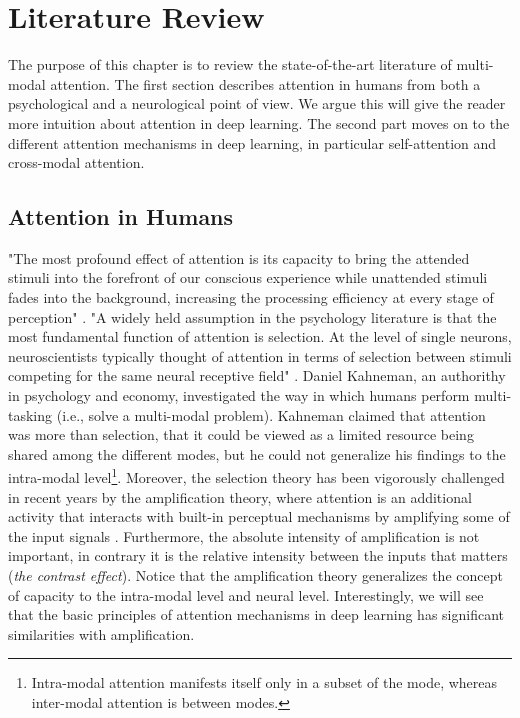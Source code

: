 \chapter{Literature Review}\label{chapter-literature-review} 

The purpose of this chapter is to review the state-of-the-art literature of multi-modal attention. The first section describes attention in humans from both a psychological and a neurological point of view. We argue this will give the reader more intuition about attention in deep learning. The second part moves on to the different attention mechanisms in deep learning, in particular self-attention and cross-modal attention. 


\section{Attention in Humans}
"The most profound effect of attention is its capacity to bring the attended stimuli into the forefront of our conscious experience while unattended stimuli fades into the background, increasing the processing efficiency at every stage of perception" \citep{watzl}. "A widely held assumption in the psychology literature is that the most fundamental function of attention is selection. At the level of single neurons, neuroscientists typically thought of attention in terms of selection between stimuli competing for the same neural receptive field" \citep{neuro-level}. Daniel Kahneman, an authorithy in psychology and economy, investigated the way in which humans perform multi-tasking (i.e., solve a multi-modal problem). Kahneman claimed that attention was more than selection, that it could be viewed as a limited resource being shared among the different modes, but he could not generalize his findings to the intra-modal level\footnote{Intra-modal attention manifests itself only in a subset of the mode, whereas inter-modal attention is between modes.}. Moreover, the selection theory has been vigorously challenged in recent years by the amplification theory, where attention is an additional activity that interacts with built-in perceptual mechanisms by amplifying some of the input signals \citep{amplification}. Furthermore, the absolute intensity of amplification is not important, in contrary it is the relative intensity between the inputs that matters (\textit{the contrast effect}). Notice that the amplification theory generalizes the concept of capacity to the intra-modal level and neural level. Interestingly, we will see that the basic principles of attention mechanisms in deep learning has significant similarities with amplification.

